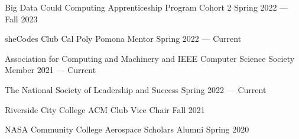 Big Data Could Computing Apprenticeship Program Cohort 2 \hfill Spring 2022 --- Fall 2023

sheCodes Club Cal Poly Pomona Mentor	\hfill Spring 2022 --- Current
 
Association for Computing and Machinery and IEEE Computer Science Society Member	\hfill 2021 --- Current

The National Society of Leadership and Success	\hfill Spring 2022 --- Current

Riverside City College ACM Club Vice Chair	\hfill Fall 2021

NASA Community College Aerospace Scholars Alumni \hfill Spring 2020



